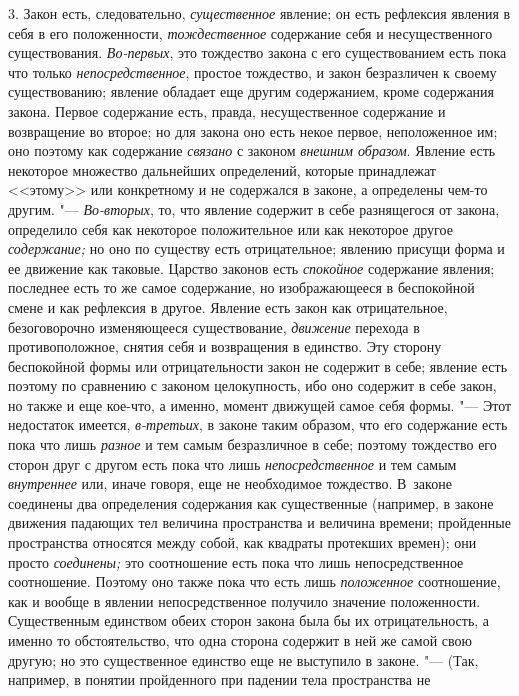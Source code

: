 3. Закон есть, следовательно, {\em существенное}
явление; он есть рефлексия явления в себя в его положенности,
{\em тождественное} содержание себя и несущественного
существования. {\em Во-первых}, это тождество закона с
его существованием есть пока что только
{\em непосредственное}, простое тождество, и закон
безразличен к своему существованию; явление обладает еще другим
содержанием, кроме содержания закона. Первое содержание есть, правда,
несущественное содержание и возвращение во второе; но для закона оно есть
некое первое, неположенное им; оно поэтому как содержание
{\em связано} с законом
{\em внешним образом}. Явление есть некоторое множество
дальнейших определений, которые принадлежат <<этому>> или конкретному и не
содержался в законе, а определены чем-то другим. "---
{\em Во-вторых}, то, что явление содержит в себе
разнящегося от закона, определило себя как некоторое положительное или как
некоторое другое {\em содержание;} но оно по существу
есть отрицательное; явлению присущи форма и ее движение как таковые.
Царство законов есть {\em спокойное} содержание
явления; последнее есть то же самое содержание, но изображающееся в
беспокойной смене и как рефлексия в другое. Явление есть закон как
отрицательное, безоговорочно изменяющееся существование,
{\em движение} перехода в противоположное, снятия себя
и возвращения в единство. Эту сторону беспокойной формы или отрицательности
закон не содержит в себе; явление есть поэтому по сравнению с законом
целокупность, ибо оно содержит в себе закон, но также и еще кое-что, а
именно, момент движущей самое себя формы. "--- Этот недостаток имеется,
{\em в-третьих}, в законе таким образом, что его
содержание есть пока что лишь {\em разное} и тем самым
безразличное в себе; поэтому тождество его сторон друг с другом есть пока
что лишь {\em непосредственное} и тем самым
{\em внутреннее} или, иначе говоря, еще не необходимое
тождество. В~законе соединены два определения содержания как существенные
(например, в законе движения падающих тел величина пространства и величина
времени; пройденные пространства относятся между собой, как квадраты
протекших времен); они просто {\em соединены;} это
соотношение есть пока что лишь непосредственное соотношение. Поэтому оно
также пока что есть лишь {\em положенное} соотношение,
как и вообще в явлении непосредственное получило значение положенности.
Существенным единством обеих сторон закона была бы их отрицательность, а
именно то обстоятельство, что одна сторона содержит в ней же самой свою
другую; но это существенное единство еще не выступило в законе. "--- (Так,
например, в понятии пройденного при падении тела пространства не
